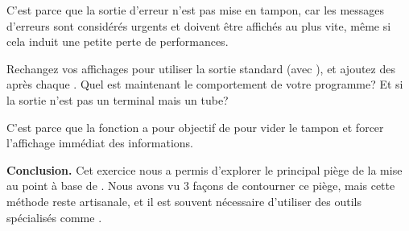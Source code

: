 \documentclass[10pt]{article}\usepackage[nu]{esial}
\begin{document}
\begin{Exercice}
  C'est parce que la sortie d'erreur n'est pas mise en tampon, car les messages
  d'erreurs sont considérés urgents et doivent être affichés au plus vite, même
  si cela induit une petite perte de performances.

  \Question Rechangez vos affichages pour utiliser la sortie standard (avec
  ), et ajoutez des  après chaque .
  Quel est maintenant le comportement de votre programme? Et si la sortie n'est
  pas un terminal mais un tube?

  C'est parce que la fonction  a pour objectif de pour vider le
  tampon et forcer l'affichage immédiat des informations.

  \medskip

  \noindent\textbf{Conclusion.} Cet exercice nous a permis d'explorer le
  principal piège de la mise au point à base de . Nous avons vu 3
  façons de contourner ce piège, mais cette méthode reste artisanale, et il est
  souvent nécessaire d'utiliser des outils spécialisés comme .
\end{Exercice}
\newpage
\end{document}
